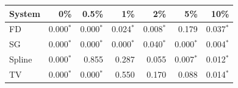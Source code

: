 \begin{tabular}{lrrrrrr}\toprule
System & 0\% & 0.5\% & 1\% & 2\% & 5\% & 10\% \\\midrule
FD & 0.000$^*$ & 0.000$^*$ & 0.024$^*$ & 0.008$^*$ & 0.179 & 0.037$^*$ \\
SG & 0.000$^*$ & 0.000$^*$ & 0.000$^*$ & 0.040$^*$ & 0.000$^*$ & 0.004$^*$ \\
Spline & 0.000$^*$ & 0.855 & 0.287 & 0.055 & 0.007$^*$ & 0.012$^*$ \\
TV & 0.000$^*$ & 0.000$^*$ & 0.550 & 0.170 & 0.088 & 0.014$^*$ \\
\bottomrule\end{tabular}
